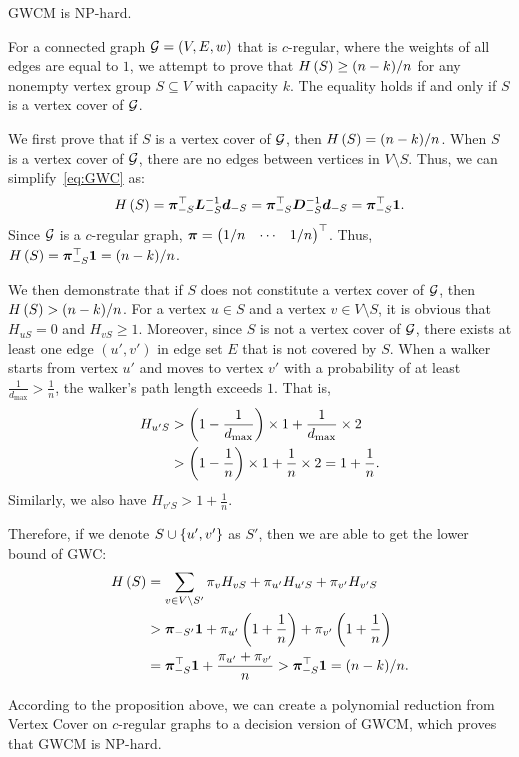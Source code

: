\documentclass[10pt,twocolumn,twoside]{IEEEtran}
\begin{document}
\begin{theorem}\label{thm:np-hard}
    GWCM is NP-hard.
\end{theorem}
\begin{IEEEproof}
    For a connected graph \(\mathcal{G}=(V,E,w)\) that is \(c\)-regular, where the weights of all edges are equal to \(1\), we attempt to prove that \(H\left(S\right)\ge (n-k)/n\) for any nonempty vertex group \(S\subseteq V\) with capacity \(k\).
    The equality holds if and only if \(S\) is a vertex cover of \(\mathcal{G}\).

    We first prove that if \(S\) is a vertex cover of \(\mathcal{G}\), then \(H\left(S\right)=(n-k)/n\). When \(S\) is a vertex cover of \(\mathcal{G}\), there are no edges between vertices in \(V\setminus S\).
    Thus, we can simplify~\eqref{eq:GWC} as:
    \begin{equation*}
        H\left(S\right)=\boldsymbol{\pi}_{-S}^\top\boldsymbol{L}_{-S}^{-1}\boldsymbol{d}_{-S}=\boldsymbol{\pi}_{-S}^\top\boldsymbol{D}_{-S}^{-1}\boldsymbol{d}_{-S}=\boldsymbol{\pi}_{-S}^\top\boldsymbol{1}.
    \end{equation*}
    Since \(\mathcal{G}\) is a \(c\)-regular graph, \(\boldsymbol{\pi}=\begin{pmatrix}1/n&\cdots&1/n\end{pmatrix}^\top\).
    Thus, \(H\left(S\right)=\boldsymbol{\pi}_{-S}^\top\boldsymbol{1}=(n-k)/n\).

    We then demonstrate that if \(S\) does not constitute a vertex cover of \(\mathcal{G}\), then \(H\left(S\right)>(n-k)/n\).
    For a vertex \(u\in S\) and a vertex \(v\in V\setminus S\), it is obvious that \(H_{uS}=0\) and \(H_{vS}\ge1\).
    Moreover, since \(S\) is not a vertex cover of \(\mathcal{G}\), there exists at least one edge \((u',v')\) in edge set \(E\) that is not covered by \(S\).
    When a walker starts from vertex \(u'\) and moves to vertex \(v'\) with a probability of at least \(\frac{1}{d_{\max}}>\frac{1}{n}\), the walker's path length exceeds \(1\).
    That is,
    \begin{align*}
        H_{u'S} & >\left( 1-\frac{1}{d_{\max}} \right)\times1+\frac{1}{d_{\max}}\times2  \\
                & >\left( 1-\frac{1}{n} \right)\times1+\frac{1}{n}\times2=1+\frac{1}{n}.
    \end{align*}
    Similarly, we also have \(H_{v'S}>1+\frac{1}{n}\).

    Therefore, if we denote \(S\cup\left\{u',v' \right\}\) as \(S'\), then we are able to get the lower bound of GWC:
    \begin{align*}
        H\left(S\right) & =\sum_{v\in V\setminus S'}\pi_vH_{vS}+\pi_{u'}H_{u'S}+\pi_{v'}H_{v'S}            \\
                 & >\boldsymbol{\pi}_{-S'}\boldsymbol{1}+\pi_{u'}\left( 1+\frac{1}{n} \right)+\pi_{v'}\left( 1+\frac{1}{n} \right) \\
                 & =\boldsymbol{\pi}_{-S}^\top\boldsymbol{1}+\frac{\pi_{u'}+\pi_{v'}}n
        >\boldsymbol{\pi}_{-S}^\top\boldsymbol{1}=(n-k)/n.
    \end{align*}

    According to the proposition above, we can create a polynomial reduction from Vertex Cover on \(c\)-regular graphs to a decision version of GWCM, which proves that GWCM is NP-hard.

\end{IEEEproof}
\end{document}
